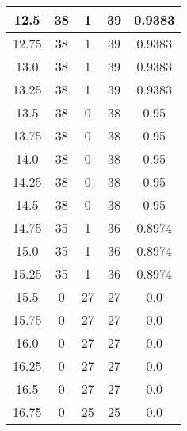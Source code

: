 \documentclass[letterpaper, 12pt]{article}
\begin{document}
\begin{longtable}{|c|c|c|c|c|}
12.5 & 38 & 1 & 39 & 0.9383 \\
\hline
12.75 & 38 & 1 & 39 & 0.9383 \\
\hline
13.0 & 38 & 1 & 39 & 0.9383 \\
\hline
13.25 & 38 & 1 & 39 & 0.9383 \\
\hline
13.5 & 38 & 0 & 38 & 0.95 \\
\hline
13.75 & 38 & 0 & 38 & 0.95 \\
\hline
14.0 & 38 & 0 & 38 & 0.95 \\
\hline
14.25 & 38 & 0 & 38 & 0.95 \\
\hline
14.5 & 38 & 0 & 38 & 0.95 \\
\hline
14.75 & 35 & 1 & 36 & 0.8974 \\
\hline
15.0 & 35 & 1 & 36 & 0.8974 \\
\hline
15.25 & 35 & 1 & 36 & 0.8974 \\
\hline
15.5 & 0 & 27 & 27 & 0.0 \\
\hline
15.75 & 0 & 27 & 27 & 0.0 \\
\hline
16.0 & 0 & 27 & 27 & 0.0 \\
\hline
16.25 & 0 & 27 & 27 & 0.0 \\
\hline
16.5 & 0 & 27 & 27 & 0.0 \\
\hline
16.75 & 0 & 25 & 25 & 0.0 \\
\hline
\end{longtable}
\end{document}
